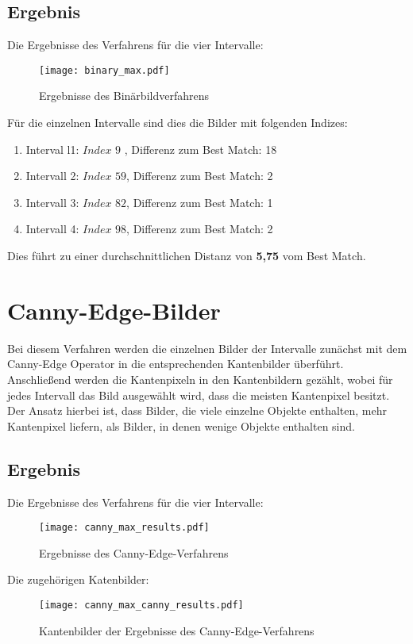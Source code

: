 \subsection{Ergebnis} 

Die Ergebnisse des Verfahrens für die vier Intervalle:
\begin{figure}[H]
  \begin{center}
    \texttt{[image: binary\_max.pdf]}
    \caption{Ergebnisse des Binärbildverfahrens}
    \label{fig:binary_bestmatch4}
  \end{center}
\end{figure}

Für die einzelnen Intervalle  sind dies die Bilder mit folgenden Indizes:
\begin{enumerate}
	\item{Interval l1: $Index$ $9$ , Differenz zum Best Match: 18}
	\item{Intervall 2: $Index$ $59$, Differenz zum Best Match: 2}
	\item{Intervall 3: $Index$ $82$, Differenz zum Best Match: 1 }
	\item{Intervall 4: $Index$ $98$, Differenz zum Best Match: 2}
\end{enumerate}

Dies führt zu einer durchschnittlichen Distanz von \textbf{5,75} vom Best Match.


\section{Canny-Edge-Bilder}
Bei diesem Verfahren werden die einzelnen Bilder der Intervalle zunächst mit dem Canny-Edge Operator in die entsprechenden Kantenbilder überführt. Anschließend werden die Kantenpixeln in den Kantenbildern gezählt, wobei für jedes Intervall das Bild ausgewählt wird, dass die meisten Kantenpixel besitzt.\\

Der Ansatz hierbei ist, dass Bilder, die viele einzelne Objekte enthalten, mehr Kantenpixel liefern, als Bilder, in denen wenige Objekte enthalten sind.
\newpage
\subsection{Ergebnis} 

Die Ergebnisse des Verfahrens für die vier Intervalle:
\begin{figure}[H]
  \begin{center}
    \texttt{[image: canny\_max\_results.pdf]}
    \caption{Ergebnisse des Canny-Edge-Verfahrens}
    \label{fig:canny_bestmatch4}
  \end{center}
\end{figure}
\newpage
Die zugehörigen Katenbilder:
\begin{figure}[H]
  \begin{center}
    \texttt{[image: canny\_max\_canny\_results.pdf]}
    \caption{Kantenbilder der Ergebnisse des Canny-Edge-Verfahrens}
    \label{fig:canny_max_bestmatch4}
  \end{center}
\end{figure}

